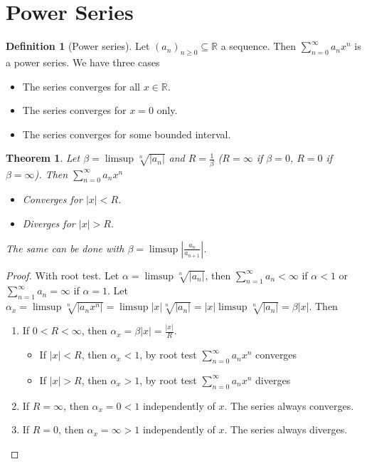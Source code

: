 \documentclass{article}
\newcommand{\DS}{\displaystyle}
\newcommand{\abs}[1]{\left|#1\right|}
\newenvironment{enumarabic}{\begin{enumerate}[label=(\arabic*)]}{\end{enumerate}}
\theoremstyle{definition}
\newtheorem{definition}{Definition}[section]
\theoremstyle{definition}
\theoremstyle{plain}
\newtheorem{theorem}{Theorem}[section]
\theoremstyle{plain}
\theoremstyle{plain}
\theoremstyle{plain}
\theoremstyle{definition}
\theoremstyle{remark}
\theoremstyle{remark}
\theoremstyle{remark}
\theoremstyle{remark}
\newcommand{\R}{\mathbb{R}}
\newcommand{\series}{\sum_{n=1}^\infty}
\newcommand{\pseries}[1]{\sum_{n=0}^\infty #1}
\begin{document}
\section{Power Series}


\begin{definition}[Power series]
  Let $(a_n)_{n \geq 0} \subseteq \R$ a sequence. Then $\pseries{a_n x^n}$ is a power series. We have three cases
  \begin{itemize}
  \item The series converges for all $x \in \R$.
  \item The series converges for $x = 0$ only.
  \item The series converges for some bounded interval.
  \end{itemize}
\end{definition}


\begin{theorem}
  Let $\beta = \limsup \sqrt[n]{|a_n|}$ and $R = \frac{1}{\beta}$ ($R = \infty$ if $\beta = 0$, $R = 0$ if $\beta = \infty$). Then $\DS \pseries{a_n x^n}$
  \begin{itemize}
  \item Converges for $|x| < R$.
  \item Diverges for $|x| > R$.
  \end{itemize}
  The same can be done with $\beta = \limsup \abs{\frac{a_n}{a_{n+1}}}$.
\end{theorem}

\begin{proof}
  With root test. Let $\alpha = \limsup \sqrt[n]{|a_n|}$, then $\DS \series{a_n} < \infty$ if $\alpha < 1$ or $\DS \series{a_n} = \infty$ if $\alpha = 1$. Let $\alpha_x = \limsup \sqrt[n]{|a_n x^n|} = \limsup |x|\sqrt[n]{|a_n|} = |x| \limsup \sqrt[n]{|a_n|} = \beta |x|$. Then
  \begin{enumarabic}
  \item If $0 < R < \infty$, then $\alpha_x = \beta |x| = \frac{|x|}{R}$.
    \begin{itemize}
    \item If $|x| < R$, then $\alpha_x < 1$, by root test $\DS \pseries{a_n x^n}$ converges
    \item If $|x| > R$, then $\alpha_x > 1$, by root test $\DS \pseries{a_n x^n}$ diverges
    \end{itemize}
  \item If $R = \infty$, then $\alpha_x = 0 < 1$ independently of $x$. The series always converges.
  \item If $R =0$, then $\alpha_x = \infty > 1$ independently of $x$. The series always diverges.
  \end{enumarabic}
\end{proof}
\end{document}
